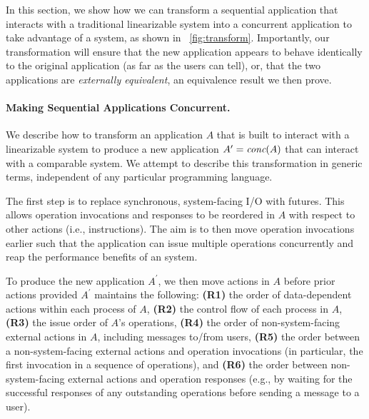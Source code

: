 In this section, we show how we can transform a sequential application that interacts with
a traditional linearizable system into a concurrent application to take advantage of a \mdl{} system, as shown in ~\ref{fig:transform}. Importantly, our transformation will ensure that the new
application appears to behave identically to the original application (as far as
the users can tell), or, that the two applications are \textit{externally equivalent}, an equivalence result we then prove.


\paragraph{Making Sequential Applications Concurrent.}
\label{sec:mdl:transform}

We describe how to transform an application $A$ that is built to
interact with a linearizable system to produce a new application
$A^\prime = \operatorname*{\textit{conc}}(A)$ that can interact with a comparable \MDL{} system.
We attempt to describe this transformation in generic terms, independent of any particular programming language.

The first step is to replace synchronous, system-facing I/O with
futures. This allows operation invocations and responses
to be reordered in $A$ with respect to other actions (i.e., instructions).
The aim is to then move operation invocations earlier such that the application
can issue multiple operations concurrently and reap the performance benefits 
of an \MDL{} system.

To produce the new application $A^\prime$, we then move actions in $A$ before prior 
actions provided $A^\prime$ maintains the following:
\textbf{(R1)} the order of data-dependent actions within
each process of $A$,
\textbf{(R2)} the control flow of each process in $A$,
\textbf{(R3)} the issue order of $A$'s operations,
\textbf{(R4)} the order of non-system-facing external
actions in $A$, including messages to/from users,
\textbf{(R5)} the order between a non-system-facing external 
actions and operation invocations (in particular, the first invocation in a
sequence of operations), and
\textbf{(R6)} the order between non-system-facing external actions and operation responses (e.g., by waiting for the successful responses of any outstanding operations before sending a message to a user).


